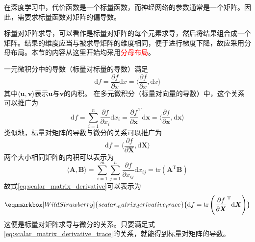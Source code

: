 在深度学习中，代价函数是一个标量函数，而神经网络的参数通常是一个矩阵。因此，需要求标量函数对矩阵的偏导数。

标量对矩阵求导，可以看作是标量对矩阵的每个元素求导，然后将结果组合成一个矩阵。结果的维度应当与被求导矩阵的维度相同，便于进行梯度下降，故应采用分母布局。本节的内容从这里开始均采用\textcolor{red}{分母布局}。

一元微积分中的导数（标量对标量的导数）满足
\begin{equation}
	\mathrm{d}f 
	= \frac{\partial f}{\partial x}\mathrm{d}x
	= \langle \frac{\partial f}{\partial x}, \mathrm{d}x \rangle
\end{equation}
其中$\langle \bm{u}, \bm{v} \rangle$表示$\bm{u}$与$\bm{v}$的内积。
在多元微积分（标量对向量的导数）中，这个关系可以推广为
\begin{equation}
	\mathrm{d}f
	= \sum_{i=1}^{n}{\frac{\partial f}{\partial x_i}\mathrm{d}x_i} 
	= {\frac{\partial f}{\partial \bm{x}}}^{\mathrm{T}}\mathrm{d}\bm{x}
	= \langle \frac{\partial f}{\partial \bm{x}}, \mathrm{d}\bm{x} \rangle
\end{equation}
类似地，标量对矩阵的导数与微分的关系可以推广为
\begin{equation}
	\mathrm{d}f
	= \langle \frac{\partial f}{\partial \bm{X}}, \mathrm{d}\bm{X} \rangle
	\label{eq:scalar_matrix_derivative}
\end{equation}
两个大小相同矩阵的内积可以表示为
\begin{equation}
	\langle \bm{A}, \bm{B} \rangle 
	= \sum_{i=1}^{m}{\sum_{j=1}^{n}{\frac{\partial f}{\partial x_{ij}}\mathrm{d}x_{ij}}} 
	= \mathrm{tr}(\bm{A}^{\mathrm{T}}\bm{B})
\end{equation}
故式\eqref{eq:scalar_matrix_derivative}可以表示为
\begin{equation}
	\eqnmarkbox[WildStrawberry]{scalar_matrix_derivative_trace}{
	\mathrm{d}f 
	= \mathrm{tr}\left({\frac{\partial f}{\partial \bm{X}}}^{\mathrm{T}}\mathrm{d}\bm{X}\right)
	}
	\label{eq:scalar_matrix_derivative_trace}
\end{equation}
这便是标量对矩阵求导与微分的关系。只要满足式\eqref{eq:scalar_matrix_derivative_trace}的关系，就能得到标量对矩阵的导数。

